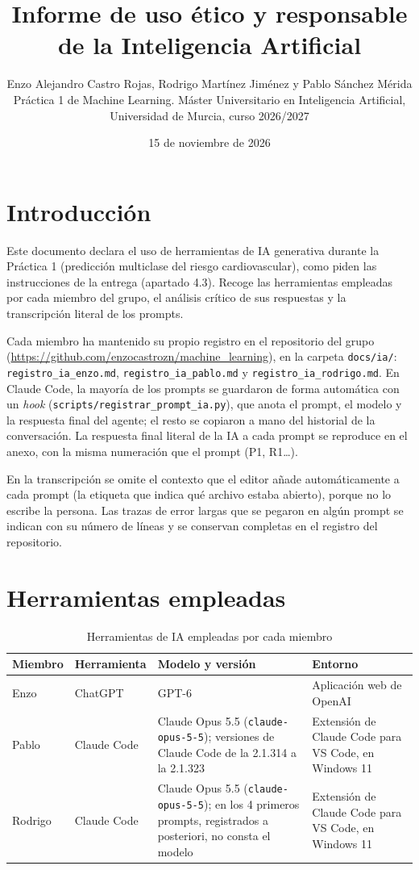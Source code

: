 \documentclass[11pt,a4paper]{article}
\title{Informe de uso ético y responsable de la Inteligencia Artificial}
\author{Enzo Alejandro Castro Rojas, Rodrigo Martínez Jiménez y Pablo Sánchez Mérida\\[0.3em]
\small Práctica 1 de Machine Learning. Máster Universitario en Inteligencia Artificial,\\
\small Universidad de Murcia, curso 2026/2027}
\date{15 de noviembre de 2026}
\begin{document}
\maketitle

\section{Introducción}
Este documento declara el uso de herramientas de IA generativa durante la Práctica 1 (predicción
multiclase del riesgo cardiovascular), como piden las instrucciones de la entrega (apartado 4.3).
Recoge las herramientas empleadas por cada miembro del grupo, el análisis crítico de sus respuestas y
la transcripción literal de los prompts.

Cada miembro ha mantenido su propio registro en el repositorio del grupo
(\url{https://github.com/enzocastrozn/machine_learning}), en la carpeta \texttt{docs/ia/}:
\texttt{registro\_ia\_enzo.md}, \texttt{registro\_ia\_pablo.md} y \texttt{registro\_ia\_rodrigo.md}.
En Claude Code, la mayoría de los prompts se guardaron de forma automática con un \textit{hook}
(\texttt{scripts/registrar\_prompt\_ia.py}), que anota el prompt, el modelo y la respuesta final del
agente; el resto se copiaron a mano del historial de la conversación. La respuesta final
literal de la IA a cada prompt se reproduce en el anexo, con la misma numeración que el prompt (P1,
R1\ldots).

En la transcripción se omite el contexto que el editor añade automáticamente a cada prompt (la
etiqueta que indica qué archivo estaba abierto), porque no lo escribe la persona. Las trazas de error
largas que se pegaron en algún prompt se indican con su número de líneas y se conservan completas en
el registro del repositorio.

\section{Herramientas empleadas}

\begin{table}[h]
\centering
\caption{Herramientas de IA empleadas por cada miembro}
\begin{tabularx}{\linewidth}{l l >{\raggedright\arraybackslash}X >{\raggedright\arraybackslash}X}
\toprule
Miembro & Herramienta & Modelo y versión & Entorno \\
\midrule
Enzo & ChatGPT & GPT-6 & Aplicación web de OpenAI \\
Pablo & Claude Code & Claude Opus 5.5 (\texttt{claude-opus-5-5}); versiones de Claude Code de la
2.1.314 a la 2.1.323 & Extensión de Claude Code para VS Code, en Windows 11 \\
Rodrigo & Claude Code & Claude Opus 5.5 (\texttt{claude-opus-5-5}); en los 4 primeros prompts,
registrados a posteriori, no consta el modelo & Extensión de Claude Code para VS Code, en Windows 11 \\
\bottomrule
\end{tabularx}
\end{table}
\end{document}
